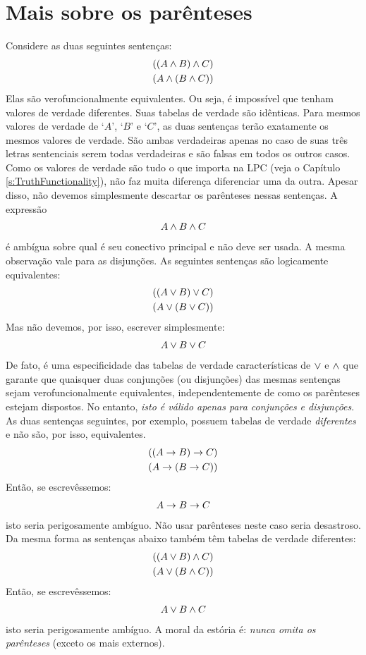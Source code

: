 \section{Mais sobre os parênteses}\label{s:MoreBracketingConventions}
Considere as duas seguintes sentenças:
	\begin{align*}
		((A \wedge B) \wedge C)\\
		(A \wedge (B \wedge C))
	\end{align*}
Elas são verofuncionalmente equivalentes.
Ou seja, é impossível que tenham valores de verdade diferentes.
Suas tabelas de verdade são idênticas.
Para mesmos valores de verdade de `$A$', `$B$' e `$C$', as duas sentenças terão exatamente os mesmos valores de verdade.
São ambas verdadeiras apenas no caso de suas três letras sentenciais serem todas verdadeiras e são falsas em todos os outros casos.
Como os valores de verdade são tudo o que importa na LPC (veja o Capítulo \ref{s:TruthFunctionality}), não faz muita diferença diferenciar uma da outra.
Apesar disso, não devemos simplesmente descartar os parênteses nessas sentenças.
A expressão
	\begin{align*}
		A \wedge B \wedge C
	\end{align*}
é ambígua sobre qual é seu conectivo principal e não deve ser usada.
A mesma observação vale para as disjunções.
As seguintes sentenças são logicamente equivalentes:
	\begin{align*}
		((A \vee B) \vee C)\\
		(A \vee (B \vee C))
	\end{align*}
Mas não devemos, por isso, escrever simplesmente:
	\begin{align*}
		A \vee B \vee C
	\end{align*}
De fato, é uma especificidade das tabelas de verdade características de $\vee$ e $\wedge$ que garante que quaisquer duas conjunções (ou disjunções) das mesmas sentenças sejam verofuncionalmente equivalentes, independentemente de como os parênteses estejam dispostos.
No entanto, \emph{isto é válido apenas para conjunções e disjunções}.
As duas sentenças seguintes, por exemplo, possuem tabelas de verdade \emph{diferentes} e não são, por isso, equivalentes.
	\begin{align*}
		((A \rightarrow B) \rightarrow C)\\
		(A \rightarrow (B \rightarrow C))
	\end{align*}
Então, se escrevêssemos:
	\begin{align*}
		A \rightarrow B \rightarrow C
	\end{align*}
isto seria perigosamente ambíguo.
Não usar parênteses neste caso seria desastroso.
Da mesma forma as sentenças abaixo também têm tabelas de verdade diferentes:
	\begin{align*}
		((A \vee B) \wedge C)\\
		(A \vee (B \wedge C))
	\end{align*}
Então, se escrevêssemos:
	\begin{align*}
		A \vee B \wedge C
	\end{align*}
isto seria perigosamente ambíguo.
A moral da estória é: \emph{nunca omita os parênteses} (exceto os mais externos).


